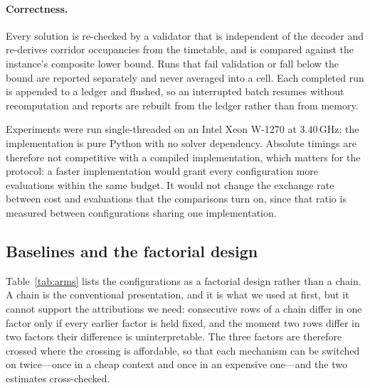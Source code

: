 \documentclass[manuscript,screen,review]{acmart}
\begin{document}
\paragraph{Correctness.}
Every solution is re-checked by a validator that is independent of the decoder
and re-derives corridor occupancies from the timetable, and is compared against
the instance's composite lower bound. Runs that fail validation or fall below
the bound are reported separately and never averaged into a cell. Each
completed run is appended to a ledger and flushed, so an interrupted batch
resumes without recomputation and reports are rebuilt from the ledger rather
than from memory.

Experiments were run single-threaded on an Intel Xeon W-1270 at $3.40$\,GHz; the
implementation is pure Python with no solver dependency. Absolute timings are
therefore not competitive with a compiled implementation, which matters for the
protocol: a faster implementation would grant every configuration more
evaluations within the same budget. It would not change the exchange rate between
cost and evaluations that the comparisons turn on, since that ratio is measured
between configurations sharing one implementation.

\subsection{Baselines and the factorial design}
\label{sec:arms}

Table~\ref{tab:arms} lists the configurations as a factorial design rather than
a chain. A chain is the conventional presentation, and it is what we used at
first, but it cannot support the attributions we need: consecutive rows of a
chain differ in one factor only if every earlier factor is held fixed, and the
moment two rows differ in two factors their difference is uninterpretable. The
three factors are therefore crossed where the crossing is affordable, so that
each mechanism can be switched on twice---once in a cheap context and once in an
expensive one---and the two estimates cross-checked.
\end{document}
